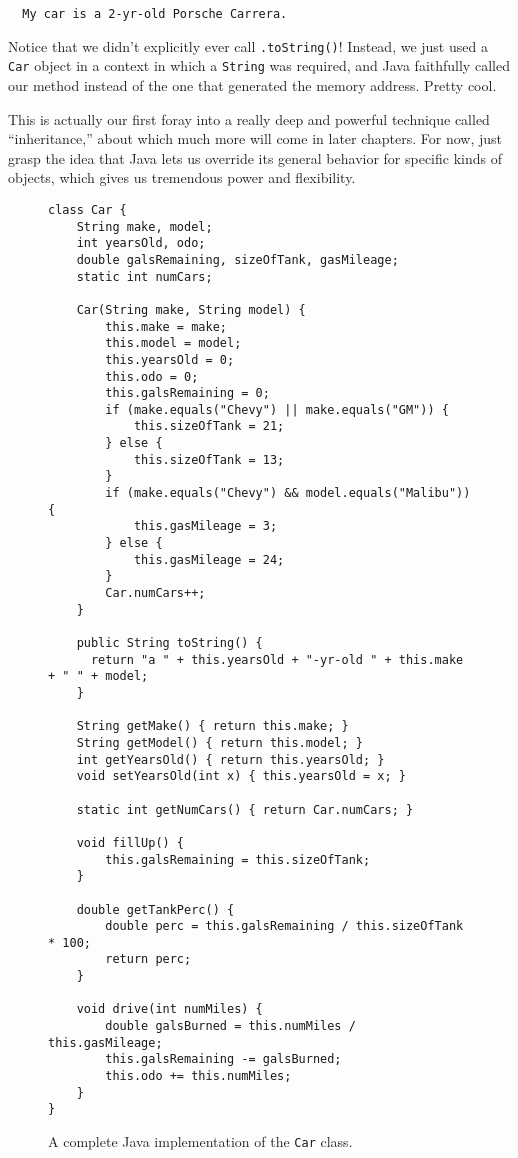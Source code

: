 \begin{verbatim}
  My car is a 2-yr-old Porsche Carrera.
\end{verbatim}

Notice that we didn't explicitly ever call \texttt{.toString()}! Instead, we
just used a \texttt{Car} object in a context in which a \texttt{String} was
required, and Java faithfully called our method instead of the one that
generated the memory address. Pretty cool.

This is actually our first foray into a really deep and powerful technique
called ``inheritance,'' about which much more will come in later chapters. For
now, just grasp the idea that Java lets us override its general behavior for
specific kinds of objects, which gives us tremendous power and flexibility.


\begin{figure}
\begin{Verbatim}[fontsize=\scriptsize,frame=single]
class Car {
    String make, model;
    int yearsOld, odo;
    double galsRemaining, sizeOfTank, gasMileage;
    static int numCars;

    Car(String make, String model) {
        this.make = make;
        this.model = model;
        this.yearsOld = 0;
        this.odo = 0;
        this.galsRemaining = 0;
        if (make.equals("Chevy") || make.equals("GM")) {
            this.sizeOfTank = 21;
        } else {
            this.sizeOfTank = 13;
        }
        if (make.equals("Chevy") && model.equals("Malibu")) {
            this.gasMileage = 3;
        } else {
            this.gasMileage = 24;
        }
        Car.numCars++;
    }

    public String toString() {
      return "a " + this.yearsOld + "-yr-old " + this.make + " " + model;
    }

    String getMake() { return this.make; }
    String getModel() { return this.model; }
    int getYearsOld() { return this.yearsOld; }
    void setYearsOld(int x) { this.yearsOld = x; }

    static int getNumCars() { return Car.numCars; }

    void fillUp() {
        this.galsRemaining = this.sizeOfTank;
    }

    double getTankPerc() {
        double perc = this.galsRemaining / this.sizeOfTank * 100;
        return perc;
    }

    void drive(int numMiles) {
        double galsBurned = this.numMiles / this.gasMileage;
        this.galsRemaining -= galsBurned;
        this.odo += this.numMiles;
    }
}
\end{Verbatim}
\caption{A complete Java implementation of the \texttt{Car} class.}
\label{fig:carClassCodePreExceptions}
\end{figure}

